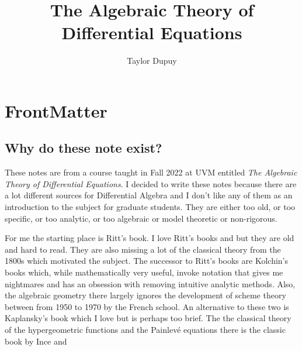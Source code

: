 \documentclass[]{book}
\title{The Algebraic Theory of Differential Equations}
\author{Taylor Dupuy }
\numberwithin{equation}{section}
\theoremstyle{definition}
\theoremstyle{remark}
\begin{document}
\maketitle

\frontmatter

\tableofcontents

\chapter{FrontMatter}

\section*{Why do these note exist?}
These notes are from a course taught in Fall 2022 at UVM entitled \emph{The Algebraic Theory of Differential Equations}. 
I decided to write these notes because there are a lot different sources for Differential Algebra and I don't like any of them as an introduction to the subject for graduate students. 
They are either too old, or too specific, or too analytic, or too algebraic or model theoretic or non-rigorous.

For me the starting place is Ritt's book. 
I love Ritt's books \cite{Ritt1932} and \cite{Ritt1950} but they are old and hard to read. 
They are also missing a lot of the classical theory from the 1800s which motivated the subject. 
The successor to Ritt's books are Kolchin's books which, while mathematically very useful, invoke notation that gives me nightmares and has an obsession with removing intuitive analytic methods. 
Also, the algebraic geometry there largely ignores the development of scheme theory between from 1950 to 1970 by the French school. 
An alternative to these two is Kaplansky's book which I love but is perhaps too brief. 
The the classical theory of the hypergeometric functions and the Painlev\'{e} equations there is the classic book by Ince and 
\end{document}

